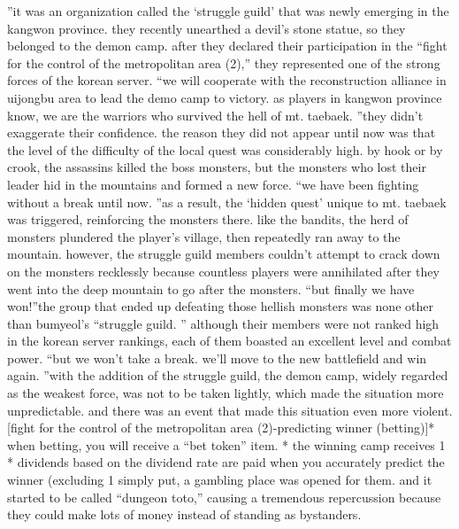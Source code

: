 ”it was an organization called the ‘struggle guild’ that was newly emerging in the kangwon province.
they recently unearthed a devil’s stone statue, so they belonged to the demon camp.
 after they declared their participation in the “fight for the control of the metropolitan area (2),” they represented one of the strong forces of the korean server.
“we will cooperate with the reconstruction alliance in uijongbu area to lead the demo camp to victory.
 as players in kangwon province know, we are the warriors who survived the hell of mt.
 taebaek.
”they didn’t exaggerate their confidence.
 the reason they did not appear until now was that the level of the difficulty of the local quest was considerably high.
by hook or by crook, the assassins killed the boss monsters, but the monsters who lost their leader hid in the mountains and formed a new force.
“we have been fighting without a break until now.
”as a result, the ‘hidden quest’ unique to mt.
 taebaek was triggered, reinforcing the monsters there.
like the bandits, the herd of monsters plundered the player’s village, then repeatedly ran away to the mountain.
 however, the struggle guild members couldn’t attempt to crack down on the monsters recklessly because countless players were annihilated after they went into the deep mountain to go after the monsters.
“but finally we have won!”the group that ended up defeating those hellish monsters was none other than bumyeol’s “struggle guild.
” although their members were not ranked high in the korean server rankings, each of them boasted an excellent level and combat power.
“but we won’t take a break.
 we’ll move to the new battlefield and win again.
”with the addition of the struggle guild, the demon camp, widely regarded as the weakest force, was not to be taken lightly, which made the situation more unpredictable.
and there was an event that made this situation even more violent.
[fight for the control of the metropolitan area (2)-predicting winner (betting)]* when betting, you will receive a “bet token” item.
* the winning camp receives 1%
* dividends based on the dividend rate are paid when you accurately predict the winner (excluding 1%
 simply put, a gambling place was opened for them.
and it started to be called “dungeon toto,” causing a tremendous repercussion because they could make lots of money instead of standing as bystanders.


